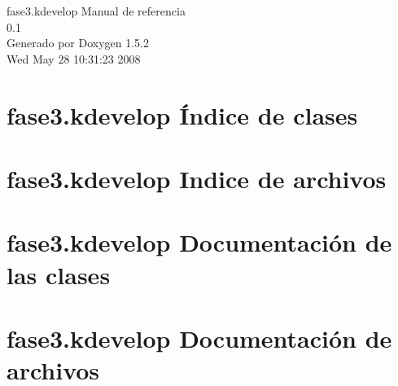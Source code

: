 \documentclass[a4paper]{book}
\begin{document}
\begin{titlepage}
\vspace*{7cm}
\begin{center}
{\Large fase3.kdevelop Manual de referencia\\[1ex]\large 0.1 }\\
\vspace*{1cm}
{\large Generado por Doxygen 1.5.2}\\
\vspace*{0.5cm}
{\small Wed May 28 10:31:23 2008}\\
\end{center}
\end{titlepage}
\clearemptydoublepage
{}
\tableofcontents
\clearemptydoublepage
{}
\chapter{fase3.kdevelop Índice de clases}

\chapter{fase3.kdevelop Indice de archivos}

\chapter{fase3.kdevelop Documentación de las clases}





\chapter{fase3.kdevelop Documentación de archivos}










\printindex
\end{document}

